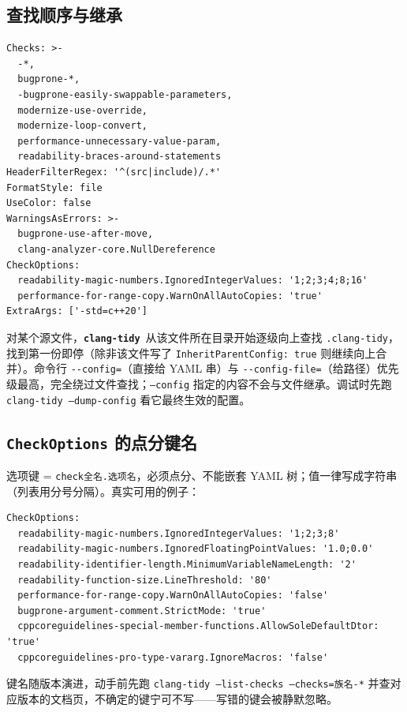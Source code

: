 \documentclass[12pt,a4paper,fontset=fandol]{ctexbook}
\newcommand{\Opt}[1]{\texttt{-\/-#1}}
\newcommand{\Lib}[1]{\textbf{\texttt{#1}}}
\newcommand{\Tidy}{\Lib{clang-tidy}}
\begin{document}
\subsection{查找顺序与继承}\label{sec:ch12-s4c}
\begin{lstlisting}[style=yamlstyle,caption={一份完整的 \texttt{.clang-tidy} 骨架},label={lst:ch12-full}]
Checks: >-
  -*,
  bugprone-*,
  -bugprone-easily-swappable-parameters,
  modernize-use-override,
  modernize-loop-convert,
  performance-unnecessary-value-param,
  readability-braces-around-statements
HeaderFilterRegex: '^(src|include)/.*'
FormatStyle: file
UseColor: false
WarningsAsErrors: >-
  bugprone-use-after-move,
  clang-analyzer-core.NullDereference
CheckOptions:
  readability-magic-numbers.IgnoredIntegerValues: '1;2;3;4;8;16'
  performance-for-range-copy.WarnOnAllAutoCopies: 'true'
ExtraArgs: ['-std=c++20']
\end{lstlisting}
\begin{note}[title={配置到底读的是哪一份}]
对某个源文件，\Tidy\ 从该文件所在目录开始逐级向上查找 \texttt{.clang-tidy}，找到第一份即停（除非该文件写了 \texttt{InheritParentConfig: true} 则继续向上合并）。命令行 \Opt{config=}（直接给 YAML 串）与 \Opt{config-file=}（给路径）优先级最高，完全绕过文件查找；\texttt{--config} 指定的内容不会与文件继承。调试时先跑 \texttt{clang-tidy --dump-config} 看它最终生效的配置。
\end{note}
\subsection{\texttt{CheckOptions} 的点分键名}\label{sec:ch12-s4d}
选项键 = \texttt{check全名.选项名}，必须点分、不能嵌套 YAML 树；值一律写成字符串（列表用分号分隔）。真实可用的例子：
\begin{lstlisting}[style=yamlstyle,caption={八个经确认存在的 \texttt{CheckOptions} 键},label={lst:ch12-opts}]
CheckOptions:
  readability-magic-numbers.IgnoredIntegerValues: '1;2;3;8'
  readability-magic-numbers.IgnoredFloatingPointValues: '1.0;0.0'
  readability-identifier-length.MinimumVariableNameLength: '2'
  readability-function-size.LineThreshold: '80'
  performance-for-range-copy.WarnOnAllAutoCopies: 'false'
  bugprone-argument-comment.StrictMode: 'true'
  cppcoreguidelines-special-member-functions.AllowSoleDefaultDtor: 'true'
  cppcoreguidelines-pro-type-vararg.IgnoreMacros: 'false'
\end{lstlisting}
键名随版本演进，动手前先跑 \texttt{clang-tidy --list-checks --checks=族名-*} 并查对应版本的文档页，不确定的键宁可不写——写错的键会被静默忽略。
\end{document}
